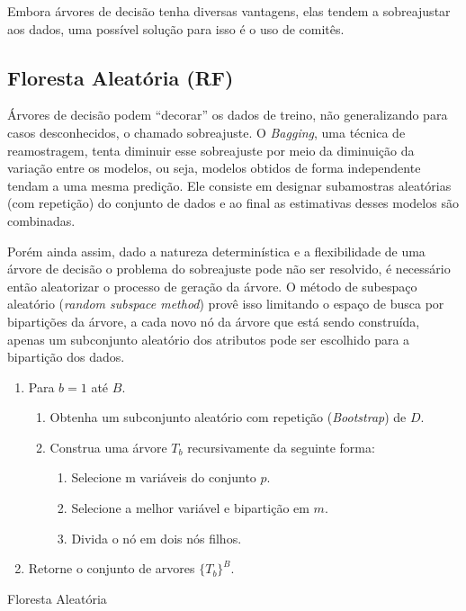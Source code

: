 Embora árvores de decisão tenha diversas vantagens, elas tendem a sobreajustar
aos dados, uma possível solução para isso é o uso de comitês.

\subsection{Floresta Aleatória (RF)}

Árvores de decisão podem ``decorar'' os dados de treino, não generalizando para
casos desconhecidos, o chamado sobreajuste. O \textit{Bagging}, uma técnica de
reamostragem, tenta diminuir esse sobreajuste por meio da diminuição da
variação entre os modelos, ou seja, modelos obtidos de forma independente
tendam a uma mesma predição. Ele consiste em designar subamostras aleatórias
(com repetição) do conjunto de dados e ao final as estimativas desses modelos
são combinadas.

Porém ainda assim, dado a natureza determinística e a flexibilidade de uma
árvore de decisão o problema do sobreajuste pode não ser resolvido, é
necessário então aleatorizar o processo de geração da árvore. O método de
subespaço aleatório (\textit{random subspace method}) provê isso limitando o
espaço de busca por bipartições da árvore, a cada novo nó da árvore que está
sendo construída, apenas um subconjunto aleatório dos atributos pode ser
escolhido para a bipartição dos dados.

\begin{algorithm}[ht]
\begin{enumerate}
    \item Para $b=1$ até $B$.
    \begin{enumerate}
        \item Obtenha um subconjunto aleatório com repetição
            (\textit{Bootstrap}) de $D$.
        \item Construa uma árvore $T_b$ recursivamente da seguinte forma:
        \begin{enumerate}
            \item Selecione m variáveis do conjunto $p$.
            \item Selecione a melhor variável e bipartição em $m$.
            \item Divida o nó em dois nós filhos.
        \end{enumerate}
    \end{enumerate}
    \item Retorne o conjunto de arvores $\{T_b\}^B$.
\end{enumerate}
 \caption{Floresta Aleatória}
 \label{algo:rf}
\end{algorithm}

